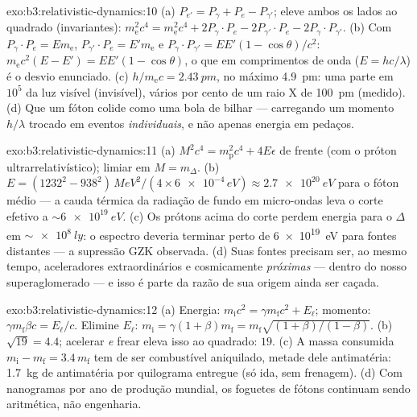 \begin{solution}{exo:b3:relativistic-dynamics:10}
(a) $P_{e'} = P_\gamma + P_e - P_{\gamma'}$; eleve ambos os lados ao
quadrado (invariantes): $m_{\text{e}}^2c^4 = m_{\text{e}}^2c^4 + 2P_\gamma\!
\cdot\!P_e - 2P_{\gamma'}\!\cdot\!P_e - 2P_\gamma\!\cdot\!P_{\gamma'}$.
(b) Com $P_\gamma\!\cdot\!P_e = E m_{\text{e}}$,
$P_{\gamma'}\!\cdot\!P_e = E'm_{\text{e}}$ e $P_\gamma\!\cdot\!
P_{\gamma'} = EE'(1 - \cos\theta)/c^2$:
$m_{\text{e}}c^2(E - E') = EE'(1 - \cos\theta)$, o que em comprimentos
de onda ($E = hc/\lambda$) é o desvio enunciado. (c) $h/m_{\text{e}}c =
\qty{2.43}{pm}$, no máximo \qty{4.9}{pm}: uma parte em $10^5$ da luz
visível (invisível), vários por cento de um raio X de \qty{100}{pm}
(medido). (d) Que um fóton colide como uma bola de bilhar ---
carregando um momento $h/\lambda$ trocado em eventos
\emph{individuais}, e não apenas energia em pedaços.
\end{solution}

\begin{solution}{exo:b3:relativistic-dynamics:11}
(a) $M^2c^4 = m_{\text{p}}^2c^4 + 4E\epsilon$ de frente (com o próton
ultrarrelativístico); limiar em $M = m_\Delta$. (b) $E =
(1232^2 - 938^2)\,\unit{MeV^2}/(4 \times \num{6e-4}\,\unit{eV})
\approx \qty{2.7e20}{eV}$ para o fóton médio --- a cauda térmica da
radiação de fundo em micro-ondas leva o corte efetivo a
$\sim\qty{6e19}{eV}$. (c) Os prótons acima do corte perdem energia
para o $\Delta$ em $\sim\qty{e8}{ly}$: o espectro deveria terminar
perto de \qty{6e19}{eV} para fontes distantes --- a supressão GZK
observada. (d) Suas fontes precisam ser, ao mesmo tempo, aceleradores
extraordinários e cosmicamente \emph{próximas} --- dentro do nosso
superaglomerado --- e isso é parte da razão de sua origem ainda ser
caçada.
\end{solution}

\begin{solution}{exo:b3:relativistic-dynamics:12}
(a) Energia: $m_{\text{i}}c^2 = \gamma m_{\text{f}}c^2 + E_\ell$;
momento: $\gamma m_{\text{f}}\beta c = E_\ell/c$. Elimine
$E_\ell$: $m_{\text{i}} = \gamma(1 + \beta)m_{\text{f}} =
m_{\text{f}}\sqrt{(1+\beta)/(1-\beta)}$. (b) $\sqrt{19} = 4.4$;
acelerar \emph{e} frear eleva isso ao quadrado: $19$. (c) A massa
consumida $m_{\text{i}} - m_{\text{f}} = 3.4\,m_{\text{f}}$ tem de ser
combustível aniquilado, metade dele antimatéria: \qty{1.7}{kg} de
antimatéria por quilograma entregue (só ida, sem frenagem). (d) Com
nanogramas por ano de produção mundial, os foguetes de fótons
continuam sendo aritmética, não engenharia.
\end{solution}

